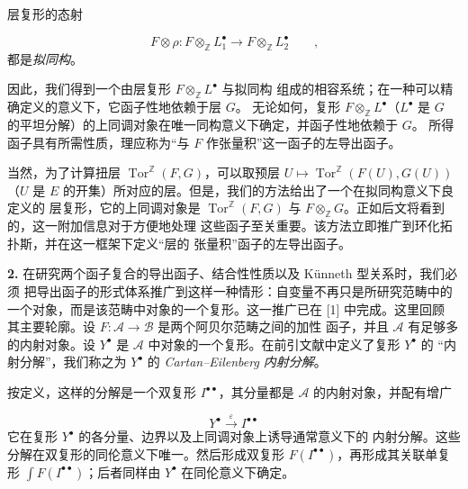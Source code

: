 \clearpage
{}
层复形的态射

\[
F\otimes\rho:
F\otimes_{\mathbb Z}L_1^{\bullet}
\longrightarrow
F\otimes_{\mathbb Z}L_2^{\bullet}
\qquad\text{,}
\]
都是\emph{拟同构}。

因此，我们得到一个由层复形 $F\otimes_{\mathbb Z}L^{\bullet}$ 与拟同构
组成的相容系统；在一种可以精确定义的意义下，它函子性地依赖于层 $G$。
无论如何，复形 $F\otimes_{\mathbb Z}L^{\bullet}$（$L^{\bullet}$ 是 $G$
的平坦分解）的上同调对象在唯一同构意义下确定，并函子性地依赖于 $G$。
所得函子具有所需性质，理应称为“与 $F$ 作张量积”这一函子的左导出函子。

当然，为了计算扭层 $\operatorname{Tor}^{\mathbb Z}(F,G)$，可以取预层
$U\longmapsto\operatorname{Tor}^{\mathbb Z}(F(U),G(U))$（$U$ 是 $E$
的开集）所对应的层。但是，我们的方法给出了一个在拟同构意义下良定义的
层复形，它的上同调对象是 $\operatorname{Tor}^{\mathbb Z}(F,G)$ 与
$F\otimes_{\mathbb Z}G$。正如后文将看到的，这一附加信息对于方便地处理
这些函子至关重要。该方法立即推广到环化拓扑斯，并在这一框架下定义“层的
张量积”函子的左导出函子。

\noindent\textbf{2.}\quad
在研究两个函子复合的导出函子、结合性性质以及 Künneth 型关系时，我们必须
把导出函子的形式体系推广到这样一种情形：自变量不再只是所研究范畴中的
一个对象，而是该范畴中对象的一个复形。这一推广已在 [1] 中完成。这里回顾
其主要轮廓。设 $F:\mathcal A\to\mathcal B$ 是两个阿贝尔范畴之间的加性
函子，并且 $\mathcal A$ 有足够多的内射对象。设 $Y^{\bullet}$ 是
$\mathcal A$ 中对象的一个复形。在前引文献中定义了复形 $Y^{\bullet}$ 的
“内射分解”，我们称之为 $Y^{\bullet}$ 的
\emph{Cartan--Eilenberg 内射分解}。

按定义，这样的分解是一个双复形 $I^{\bullet\bullet}$，其分量都是
$\mathcal A$ 的内射对象，并配有增广

\[
Y^{\bullet}\xrightarrow{\varepsilon}I^{\bullet\bullet}
\]
它在复形 $Y^{\bullet}$ 的各分量、边界以及上同调对象上诱导通常意义下的
内射分解。这些分解在双复形的同伦意义下唯一。然后形成双复形
$F(I^{\bullet\bullet})$，再形成其关联单复形
$\int F(I^{\bullet\bullet})$；后者同样由 $Y^{\bullet}$ 在同伦意义下确定。

